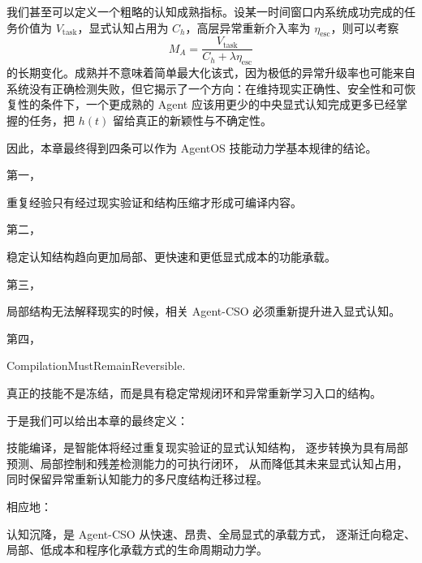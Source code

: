 我们甚至可以定义一个粗略的认知成熟指标。设某一时间窗口内系统成功完成的任务价值为 $V_{\mathrm{task}}$，显式认知占用为 $C_h$，高层异常重新介入率为 $\eta_{\mathrm{esc}}$，则可以考察
\[
M_A
=
\frac{V_{\mathrm{task}}}
{C_h+\lambda\eta_{\mathrm{esc}}}
\]
的长期变化。成熟并不意味着简单最大化该式，因为极低的异常升级率也可能来自系统没有正确检测失败，但它揭示了一个方向：在维持现实正确性、安全性和可恢复性的条件下，一个更成熟的 Agent 应该用更少的中央显式认知完成更多已经掌握的任务，把 $h(t)$ 留给真正的新颖性与不确定性。

因此，本章最终得到四条可以作为 AgentOS 技能动力学基本规律的结论。

第一，
\begin{statementbox}
\centering
{}
\end{statementbox}
重复经验只有经过现实验证和结构压缩才形成可编译内容。

第二，
\begin{statementbox}
\centering
{}
\end{statementbox}
稳定认知结构趋向更加局部、更快速和更低显式成本的功能承载。

第三，
\begin{statementbox}
\centering
{}
\end{statementbox}
局部结构无法解释现实的时候，相关 Agent-CSO 必须重新提升进入显式认知。

第四，
\begin{statementbox}
CompilationMustRemainReversible.
\end{statementbox}
真正的技能不是冻结，而是具有稳定常规闭环和异常重新学习入口的结构。

于是我们可以给出本章的最终定义：

\begin{definition*}
技能编译，是智能体将经过重复现实验证的显式认知结构，
逐步转换为具有局部预测、局部控制和残差检测能力的可执行闭环，
从而降低其未来显式认知占用，同时保留异常重新认知能力的多尺度结构迁移过程。
\end{definition*}

相应地：

\begin{statementbox}
认知沉降，是 Agent-CSO 从快速、昂贵、全局显式的承载方式，
逐渐迁向稳定、局部、低成本和程序化承载方式的生命周期动力学。
\end{statementbox}


